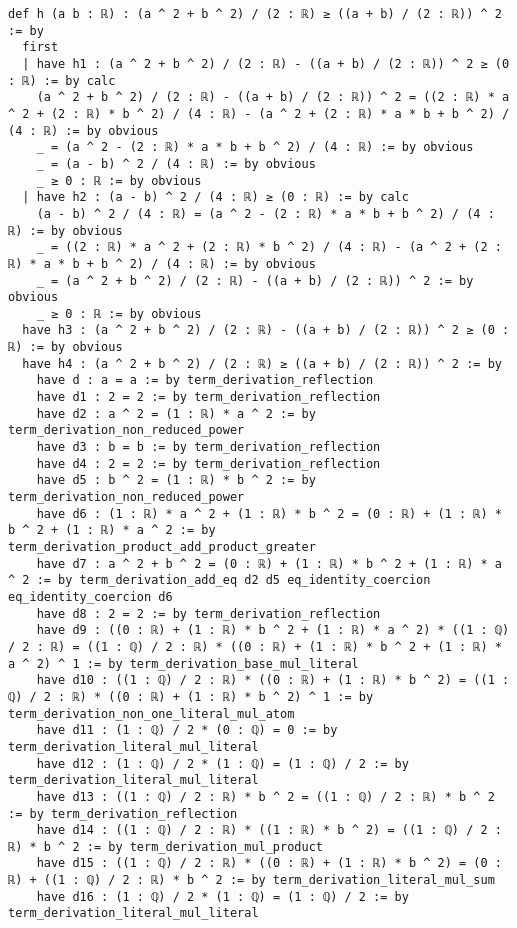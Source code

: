 \documentclass{article}
\begin{document}
\begin{tcolorbox}[colback=white!10, width=\linewidth]
\begin{lstlisting}[language=Lean4]
def h (a b : ℝ) : (a ^ 2 + b ^ 2) / (2 : ℝ) ≥ ((a + b) / (2 : ℝ)) ^ 2 := by
  first
  | have h1 : (a ^ 2 + b ^ 2) / (2 : ℝ) - ((a + b) / (2 : ℝ)) ^ 2 ≥ (0 : ℝ) := by calc
    (a ^ 2 + b ^ 2) / (2 : ℝ) - ((a + b) / (2 : ℝ)) ^ 2 = ((2 : ℝ) * a ^ 2 + (2 : ℝ) * b ^ 2) / (4 : ℝ) - (a ^ 2 + (2 : ℝ) * a * b + b ^ 2) / (4 : ℝ) := by obvious
    _ = (a ^ 2 - (2 : ℝ) * a * b + b ^ 2) / (4 : ℝ) := by obvious
    _ = (a - b) ^ 2 / (4 : ℝ) := by obvious
    _ ≥ 0 : ℝ := by obvious
  | have h2 : (a - b) ^ 2 / (4 : ℝ) ≥ (0 : ℝ) := by calc
    (a - b) ^ 2 / (4 : ℝ) = (a ^ 2 - (2 : ℝ) * a * b + b ^ 2) / (4 : ℝ) := by obvious
    _ = ((2 : ℝ) * a ^ 2 + (2 : ℝ) * b ^ 2) / (4 : ℝ) - (a ^ 2 + (2 : ℝ) * a * b + b ^ 2) / (4 : ℝ) := by obvious
    _ = (a ^ 2 + b ^ 2) / (2 : ℝ) - ((a + b) / (2 : ℝ)) ^ 2 := by obvious
    _ ≥ 0 : ℝ := by obvious
  have h3 : (a ^ 2 + b ^ 2) / (2 : ℝ) - ((a + b) / (2 : ℝ)) ^ 2 ≥ (0 : ℝ) := by obvious
  have h4 : (a ^ 2 + b ^ 2) / (2 : ℝ) ≥ ((a + b) / (2 : ℝ)) ^ 2 := by
    have d : a = a := by term_derivation_reflection
    have d1 : 2 = 2 := by term_derivation_reflection
    have d2 : a ^ 2 = (1 : ℝ) * a ^ 2 := by term_derivation_non_reduced_power
    have d3 : b = b := by term_derivation_reflection
    have d4 : 2 = 2 := by term_derivation_reflection
    have d5 : b ^ 2 = (1 : ℝ) * b ^ 2 := by term_derivation_non_reduced_power
    have d6 : (1 : ℝ) * a ^ 2 + (1 : ℝ) * b ^ 2 = (0 : ℝ) + (1 : ℝ) * b ^ 2 + (1 : ℝ) * a ^ 2 := by term_derivation_product_add_product_greater
    have d7 : a ^ 2 + b ^ 2 = (0 : ℝ) + (1 : ℝ) * b ^ 2 + (1 : ℝ) * a ^ 2 := by term_derivation_add_eq d2 d5 eq_identity_coercion eq_identity_coercion d6
    have d8 : 2 = 2 := by term_derivation_reflection
    have d9 : ((0 : ℝ) + (1 : ℝ) * b ^ 2 + (1 : ℝ) * a ^ 2) * ((1 : ℚ) / 2 : ℝ) = ((1 : ℚ) / 2 : ℝ) * ((0 : ℝ) + (1 : ℝ) * b ^ 2 + (1 : ℝ) * a ^ 2) ^ 1 := by term_derivation_base_mul_literal
    have d10 : ((1 : ℚ) / 2 : ℝ) * ((0 : ℝ) + (1 : ℝ) * b ^ 2) = ((1 : ℚ) / 2 : ℝ) * ((0 : ℝ) + (1 : ℝ) * b ^ 2) ^ 1 := by term_derivation_non_one_literal_mul_atom
    have d11 : (1 : ℚ) / 2 * (0 : ℚ) = 0 := by term_derivation_literal_mul_literal
    have d12 : (1 : ℚ) / 2 * (1 : ℚ) = (1 : ℚ) / 2 := by term_derivation_literal_mul_literal
    have d13 : ((1 : ℚ) / 2 : ℝ) * b ^ 2 = ((1 : ℚ) / 2 : ℝ) * b ^ 2 := by term_derivation_reflection
    have d14 : ((1 : ℚ) / 2 : ℝ) * ((1 : ℝ) * b ^ 2) = ((1 : ℚ) / 2 : ℝ) * b ^ 2 := by term_derivation_mul_product
    have d15 : ((1 : ℚ) / 2 : ℝ) * ((0 : ℝ) + (1 : ℝ) * b ^ 2) = (0 : ℝ) + ((1 : ℚ) / 2 : ℝ) * b ^ 2 := by term_derivation_literal_mul_sum
    have d16 : (1 : ℚ) / 2 * (1 : ℚ) = (1 : ℚ) / 2 := by term_derivation_literal_mul_literal

\end{lstlisting}
\end{tcolorbox}
\end{document}
